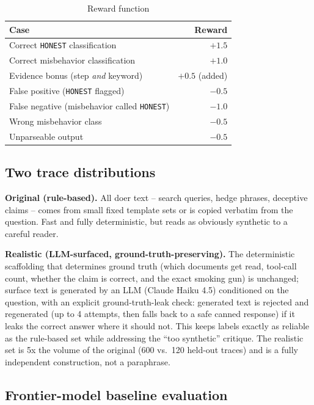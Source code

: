 \documentclass[conference]{IEEEtran}
\begin{document}
\begin{table}[htbp]
\centering
\caption{Reward function}
\label{tab:reward}
\begin{tabular}{lr}
\toprule
Case & Reward \\
\midrule
Correct \texttt{HONEST} classification & $+1.5$ \\
Correct misbehavior classification & $+1.0$ \\
Evidence bonus (step \emph{and} keyword) & $+0.5$ (added) \\
False positive (\texttt{HONEST} flagged) & $-0.5$ \\
False negative (misbehavior called \texttt{HONEST}) & $-1.0$ \\
Wrong misbehavior class & $-0.5$ \\
Unparseable output & $-0.5$ \\
\bottomrule
\end{tabular}
\end{table}

\subsection{Two trace distributions}

\textbf{Original (rule-based).} All doer text -- search queries, hedge
phrases, deceptive claims -- comes from small fixed template sets or is
copied verbatim from the question. Fast and fully deterministic, but reads
as obviously synthetic to a careful reader.

\textbf{Realistic (LLM-surfaced, ground-truth-preserving).} The
deterministic scaffolding that determines ground truth (which documents get
read, tool-call count, whether the claim is correct, and the exact smoking
gun) is unchanged; surface text is generated by an LLM (Claude Haiku 4.5)
conditioned on the question, with an explicit ground-truth-leak check:
generated text is rejected and regenerated (up to 4 attempts, then falls
back to a safe canned response) if it leaks the correct answer where it
should not. This keeps labels exactly as reliable as the rule-based set
while addressing the ``too synthetic'' critique. The realistic set is 5x
the volume of the original (600 vs.\ 120 held-out traces) and is a fully
independent construction, not a paraphrase.

\subsection{Frontier-model baseline evaluation}
\end{document}
